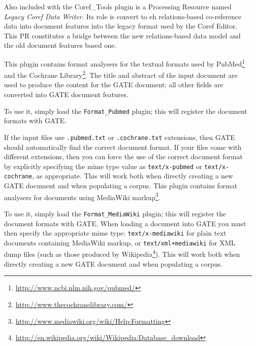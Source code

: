Also included with the Coref\_Tools plugin is a Processing Resource named {\em
Legacy Coref Data Writer}. Its role is convert to eh relations-based
co-reference data into document features into the legacy format used by the
Coref Editor. This PR constitutes a bridge between the new relations-based data
model and the old document features based one.

%
This plugin contains format analysers for the textual formats used by
PubMed\footnote{\url{http://www.ncbi.nlm.nih.gov/pubmed/}} and the Cochrane
Library\footnote{\url{http://www.thecochranelibrary.com/}}. The title and
abstract of the input document are used to produce the content for the GATE
document; all other fields are converted into GATE document features.

To use it, simply load the \verb!Format_Pubmed! plugin; this will register the
document formats with GATE.

If the input files use {\tt .pubmed.txt} or {\tt .cochrane.txt} extensions, then
GATE should automatically find the correct document format. If your files come
with different extensions, then you can force the use of the correct document
format by explicitly specifying the mime type value as \verb!text/x-pubmed! or
\verb!text/x-cochrane!, as appropriate. This will work both when directly
creating a new GATE document and when populating a corpus.
%
%
This plugin contains format analysers for documents using MediaWiki
markup\footnote{\url{http://www.mediawiki.org/wiki/Help:Formatting}}.

To use it, simply load the \verb!Format_MediaWiki! plugin; this will register the
document formats with GATE. When loading a document into GATE you must then
specify the appropriate mime type: \verb!text/x-mediawiki! for plain text documents
containing MediaWiki markup, or \verb!text/xml+mediawiki! for XML dump files (such
as those produced by
Wikipedia\footnote{\url{http://en.wikipedia.org/wiki/Wikipedia:Database_download}}).
This will work both when directly creating a new GATE document and when populating
a corpus.


